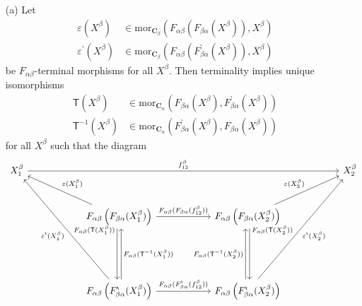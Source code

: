 \begin{prf}
\begin{enumerate}
\item[(a)]
Let
\begin{align*}
  \varepsilon(X^{\beta})
  &\in
  \mathrm{mor}_{\mathbf{C}_{\beta}}
  \left(
    F_{\alpha\beta}(F_{\beta\alpha}(X^{\beta})),
    X^{\beta}
  \right)
  \\
  \varepsilon^{\backprime}(X^{\beta})
  &\in
  \mathrm{mor}_{\mathbf{C}_{\beta}}
  \left(
    F_{\alpha\beta}(F_{\beta\alpha}^{\backprime}(X^{\beta})),
    X^{\beta}
  \right)
\end{align*}
be $F_{\alpha\beta}$-terminal morphisms for all $X^{\beta}$. Then terminality implies unique isomorphisms
\begin{align*}
  \mathsf{T}(X^{\beta})
  &\in
  \mathrm{mor}_{\mathbf{C}_{\alpha}}
  \left(
    F_{\beta\alpha}(X^{\beta}),
    F_{\beta\alpha}^{\backprime}(X^{\beta})
  \right)
  \\
  \mathsf{T}^{-1}(X^{\beta})
  &\in
  \mathrm{mor}_{\mathbf{C}_{\alpha}}
  \left(
    F_{\beta\alpha}^{\backprime}(X^{\beta}),
    F_{\beta\alpha}(X^{\beta})
  \right)
\end{align*}
for all $X^{\beta}$ such that the diagram
\[
\begin{tikzcd}[row sep=large, column sep=5.8em]
  X_{1}^{\beta}
  \arrow{rrr}{f_{12}^{\beta}}
  &
  &
  &
  X_{2}^{\beta}
  \\
  &
  F_{\alpha\beta}
  \left(
    F_{\beta\alpha}(X_{1}^{\beta})
  \right)
  \arrow{r}{F_{\alpha\beta}(F_{\beta\alpha}(f_{12}^{\beta}))}
  \arrow[swap,shift right=0.5ex]{dd}[yshift=9mm]{F_{\alpha\beta}(\mathsf{T}(X_{1}^{\beta}))}
  \arrow[swap]{ul}{\varepsilon(X_{1}^{\beta})}
  &
  F_{\alpha\beta}
  \left(
    F_{\beta\alpha}(X_{2}^{\beta})
  \right)
  \arrow{ur}{\varepsilon(X_{2}^{\beta})}
  \arrow[shift left=0.5ex]{dd}[yshift=9mm]{F_{\alpha\beta}(\mathsf{T}(X_{2}^{\beta}))}
  &
  \\
  &
  &
  &
  \\
  &
  F_{\alpha\beta}
  \left(
    F_{\beta\alpha}^{\backprime}(X_{1}^{\beta})
  \right)
  \arrow[swap,shift right=0.5ex]{uu}{F_{\alpha\beta}(\mathsf{T}^{-1}(X_{1}^{\beta}))}
  \arrow{r}{F_{\alpha\beta}(F_{\beta\alpha}^{\backprime}(f_{12}^{\beta}))}
  \arrow{uuul}{\varepsilon^{\backprime}(X_{1}^{\beta})}
  &
  F_{\alpha\beta}
  \left(
    F_{\beta\alpha}^{\backprime}(X_{2}^{\beta})
  \right)
  \arrow[shift left=0.5ex]{uu}{F_{\alpha\beta}(\mathsf{T}^{-1}(X_{2}^{\beta}))}
  \arrow[swap]{uuur}{\varepsilon^{\backprime}(X_{2}^{\beta})}

\end{tikzcd}\]
\end{enumerate}
\end{prf}
